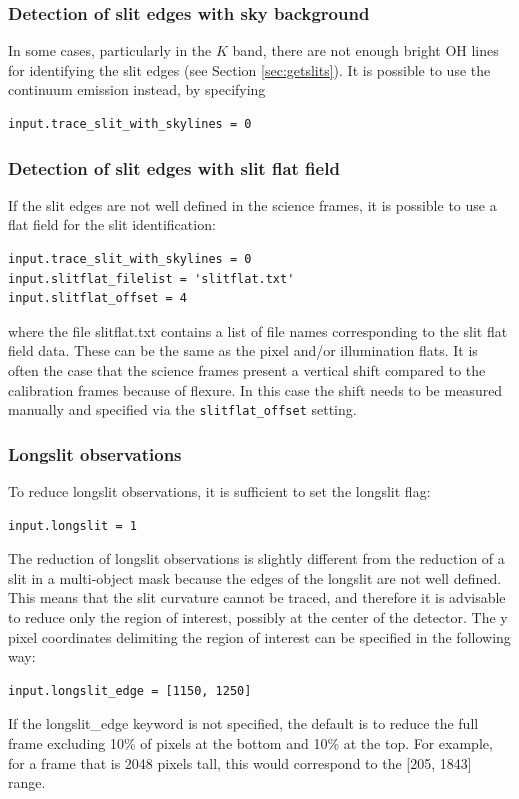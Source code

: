 \documentclass[a4paper, notitlepage]{article}
\begin{document}
\subsubsection{Detection of slit edges with sky background}
\label{sec:use_sky_edge}

In some cases, particularly in the $K$ band, there are not enough bright OH lines for identifying the slit edges (see Section \ref{sec:getslits}). It is possible to use the continuum emission instead, by specifying
\begin{lstlisting}
input.trace_slit_with_skylines = 0
\end{lstlisting}


\subsubsection{Detection of slit edges with slit flat field}

If the slit edges are not well defined in the science frames, it is possible to use a flat field for the slit identification:
\begin{lstlisting}
input.trace_slit_with_skylines = 0
input.slitflat_filelist = 'slitflat.txt'
input.slitflat_offset = 4
\end{lstlisting}
where the file slitflat.txt contains a list of file names corresponding to the slit flat field data. These can be the same as the pixel and/or illumination flats.
It is often the case that the science frames present a vertical shift compared to the calibration frames because of flexure. In this case the shift needs to be measured manually and specified via the \texttt{slitflat\_offset} setting.


\subsubsection{Longslit observations}

To reduce longslit observations, it is sufficient to set the longslit flag:
\begin{lstlisting}
input.longslit = 1
\end{lstlisting}

The reduction of longslit observations is slightly different from the reduction of a slit in a multi-object mask because the edges of the longslit are not well defined. This means that the slit curvature cannot be traced, and therefore it is advisable to reduce only the region of interest, possibly at the center of the detector. The y pixel coordinates delimiting the region of interest can be specified in the following way:
\begin{lstlisting}
input.longslit_edge = [1150, 1250]
\end{lstlisting}
If the longslit\_edge keyword is not specified, the default is to reduce the full frame excluding 10\% of pixels at the bottom and 10\% at the top. For example, for a frame that is 2048 pixels tall, this would correspond to the [205, 1843] range.
\end{document}
